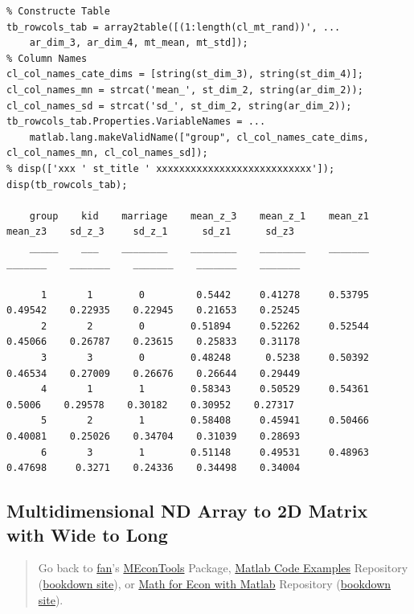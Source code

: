 \documentclass[
]{book}
\begin{document}
\begin{verbatim}
% Constructe Table
tb_rowcols_tab = array2table([(1:length(cl_mt_rand))', ...
    ar_dim_3, ar_dim_4, mt_mean, mt_std]);
% Column Names
cl_col_names_cate_dims = [string(st_dim_3), string(st_dim_4)];
cl_col_names_mn = strcat('mean_', st_dim_2, string(ar_dim_2));
cl_col_names_sd = strcat('sd_', st_dim_2, string(ar_dim_2));
tb_rowcols_tab.Properties.VariableNames = ...
    matlab.lang.makeValidName(["group", cl_col_names_cate_dims, cl_col_names_mn, cl_col_names_sd]);
% disp(['xxx ' st_title ' xxxxxxxxxxxxxxxxxxxxxxxxxxx']);
disp(tb_rowcols_tab);

    group    kid    marriage    mean_z_3    mean_z_1    mean_z1    mean_z3    sd_z_3     sd_z_1      sd_z1      sd_z3 
    _____    ___    ________    ________    ________    _______    _______    _______    _______    _______    _______

      1       1        0         0.5442     0.41278     0.53795    0.49542    0.22935    0.22945    0.21653    0.25245
      2       2        0        0.51894     0.52262     0.52544    0.45066    0.26787    0.23615    0.25833    0.31178
      3       3        0        0.48248      0.5238     0.50392    0.46534    0.27009    0.26676    0.26644    0.29449
      4       1        1        0.58343     0.50529     0.54361     0.5006    0.29578    0.30182    0.30952    0.27317
      5       2        1        0.58408     0.45941     0.50466    0.40081    0.25026    0.34704    0.31039    0.28693
      6       3        1        0.51148     0.49531     0.48963    0.47698     0.3271    0.24336    0.34498    0.34004
\end{verbatim}

\hypertarget{multidimensional-nd-array-to-2d-matrix-with-wide-to-long}{%
\subsection{Multidimensional ND Array to 2D Matrix with Wide to Long}\label{multidimensional-nd-array-to-2d-matrix-with-wide-to-long}}

\begin{quote}
Go back to \href{http://fanwangecon.github.io/}{fan}'s \href{https://fanwangecon.github.io/MEconTools/}{MEconTools} Package, \href{https://fanwangecon.github.io/M4Econ/}{Matlab Code Examples} Repository (\href{https://fanwangecon.github.io/M4Econ/bookdown}{bookdown site}), or \href{https://fanwangecon.github.io/Math4Econ/}{Math for Econ with Matlab} Repository (\href{https://fanwangecon.github.io/Math4Econ/bookdown}{bookdown site}).
\end{quote}
\end{document}
